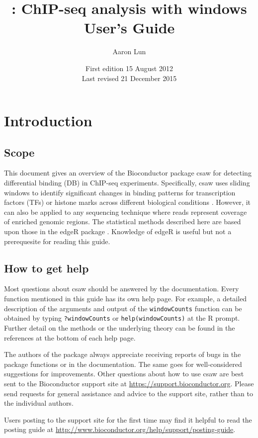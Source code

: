 \documentclass[12pt]{report}
\title{\pkgname{}: ChIP-seq analysis with windows \\ \vspace{0.2in} User's Guide}
\author{Aaron Lun}
\date{First edition 15 August 2012\\
\vspace{6pt}
Last revised 21 December 2015}
\newcommand{\edger}{edgeR}
\newcommand{\pkgname}{csaw}
\newcommand{\code}[1]{{\small\texttt{#1}}}
\newcommand{\R}{\textsf{R}}
\begin{document}
\maketitle
\tableofcontents


\newpage
{}

\chapter{Introduction}
\section{Scope}
This document gives an overview of the Bioconductor package \pkgname{} for detecting differential binding (DB) in ChIP-seq experiments.
Specifically, \pkgname{} uses sliding windows to identify significant changes in binding patterns for transcription factors (TFs) or histone marks across different biological conditions \citep{lun2015csaw}.
However, it can also be applied to any sequencing technique where reads represent coverage of enriched genomic regions.
The statistical methods described here are based upon those in the \edger{} package \citep{robinson2010}. 
Knowledge of \edger{} is useful but not a prerequesite for reading this guide.

\section{How to get help}
Most questions about \pkgname{} should be answered by the documentation. 
Every function mentioned in this guide has its own help page. 
For example, a detailed description of the arguments and output of the \code{windowCounts} function can be obtained by typing \code{?windowCounts} or \code{help(windowCounts)} at the \R{} prompt. 
Further detail on the methods or the underlying theory can be found in the references at the bottom of each help page.

The authors of the package always appreciate receiving reports of bugs in the package functions or in the documentation. 
The same goes for well-considered suggestions for improvements. 
Other questions about how to use \pkgname{} are best sent to the Bioconductor support site at \url{https://support.bioconductor.org}.
Please send requests for general assistance and advice to the support site, rather than to the individual authors. 

Users posting to the support site for the first time may find it helpful to read the posting guide at \url{http://www.bioconductor.org/help/support/posting-guide}.
\end{document}
